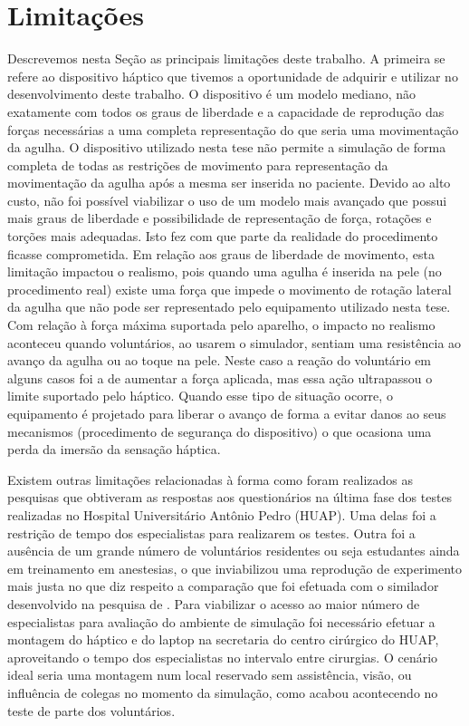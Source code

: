 \section{Limitações}

Descrevemos nesta Seção as principais limitações deste trabalho. A primeira se refere ao dispositivo háptico que tivemos a oportunidade de adquirir e utilizar no desenvolvimento deste trabalho. O dispositivo é um modelo mediano, não exatamente com todos os graus de liberdade e a capacidade de reprodução das forças necessárias a uma completa representação do que seria uma movimentação da agulha. O dispositivo utilizado nesta tese não permite a simulação de forma completa de todas as restrições de movimento para representação da movimentação da agulha após a mesma ser inserida no paciente. Devido ao alto custo, não foi possível viabilizar o uso de um modelo mais avançado que possui mais graus de liberdade e possibilidade de representação de força, rotações e torções mais adequadas. Isto fez com que parte da realidade do procedimento ficasse comprometida. Em relação aos graus de liberdade de movimento, esta limitação impactou o realismo, pois quando uma agulha é inserida na pele (no procedimento real) existe uma força que impede o movimento de rotação lateral da agulha que não pode ser representado pelo equipamento utilizado nesta tese. Com relação à força máxima suportada pelo aparelho, o impacto no realismo aconteceu quando voluntários, ao usarem o simulador, sentiam uma resistência ao avanço da agulha ou ao toque na pele. Neste caso a reação do voluntário em alguns casos foi a de aumentar a força aplicada, mas essa ação ultrapassou o limite suportado pelo háptico. Quando esse tipo de situação ocorre, o equipamento é projetado para liberar o avanço de forma a evitar danos ao seus mecanismos (procedimento de segurança do dispositivo) o que ocasiona uma perda da imersão da sensação háptica.

Existem outras limitações relacionadas à forma como foram realizados as pesquisas que obtiveram as respostas aos questionários na última fase dos testes realizadas no Hospital Universitário Antônio Pedro (HUAP). Uma delas foi a restrição de tempo dos especialistas para realizarem os testes. Outra foi a ausência de um grande número de voluntários residentes ou seja estudantes ainda em treinamento em anestesias, o que inviabilizou uma reprodução de experimento mais justa no que diz respeito a comparação que foi efetuada com o similador desenvolvido na pesquisa de \textcite{Farber2008}. Para viabilizar o acesso ao maior número de especialistas para avaliação do ambiente de simulação foi necessário efetuar a montagem do háptico e do laptop na secretaria do centro cirúrgico do HUAP, aproveitando o tempo dos especialistas no intervalo entre cirurgias. O cenário ideal seria uma montagem num local reservado sem assistência, visão, ou influência de colegas no momento da simulação, como acabou acontecendo no teste de parte dos voluntários. 

